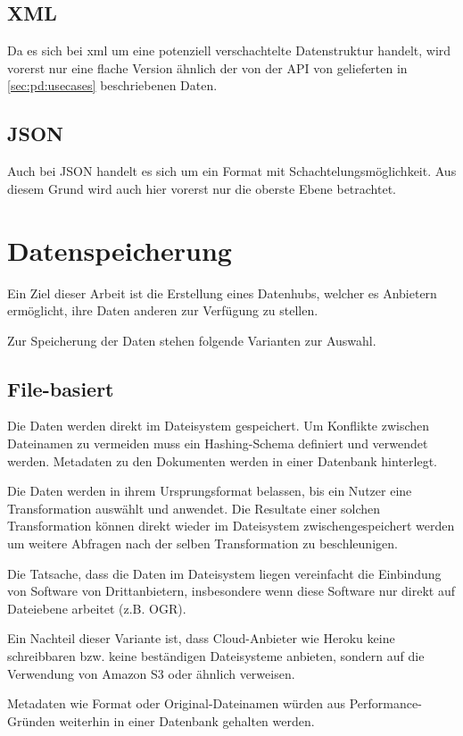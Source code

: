 \subsection{XML}
Da es sich bei \acs{xml} um eine potenziell verschachtelte Datenstruktur handelt, wird vorerst nur eine flache Version ähnlich der von der API von  gelieferten in \cref{sec:pd:usecases} beschriebenen Daten. 

\subsection{JSON}
Auch bei JSON handelt es sich um ein Format mit Schachtelungsmöglichkeit. Aus diesem Grund wird auch hier vorerst nur die oberste Ebene betrachtet.


\section{Datenspeicherung}
Ein Ziel dieser Arbeit ist die Erstellung eines Datenhubs, welcher es Anbietern ermöglicht, ihre Daten anderen zur Verfügung zu stellen. 

Zur Speicherung der Daten stehen folgende Varianten zur Auswahl.

\subsection{File-basiert}
Die Daten werden direkt im Dateisystem gespeichert. Um Konflikte zwischen Dateinamen zu vermeiden muss ein Hashing-Schema definiert und verwendet werden. Metadaten zu den Dokumenten werden in einer Datenbank hinterlegt.

Die Daten werden in ihrem Ursprungsformat belassen, bis ein Nutzer eine Transformation auswählt und anwendet. Die Resultate einer solchen Transformation können direkt wieder im Dateisystem zwischengespeichert werden um weitere Abfragen nach der selben Transformation zu beschleunigen.

Die Tatsache, dass die Daten im Dateisystem liegen vereinfacht die Einbindung von Software von Drittanbietern, insbesondere wenn diese Software nur direkt auf Dateiebene arbeitet (z.B. OGR).

Ein Nachteil dieser Variante ist, dass Cloud-Anbieter wie Heroku keine schreibbaren \cite{herokuReadOnlyFilesystem} bzw. keine beständigen \cite{herokuEphemeralFilesystem} Dateisysteme anbieten, sondern auf die Verwendung von Amazon S3 oder ähnlich verweisen.

Metadaten wie Format oder Original-Dateinamen würden aus Performance-Gründen weiterhin in einer Datenbank gehalten werden.

